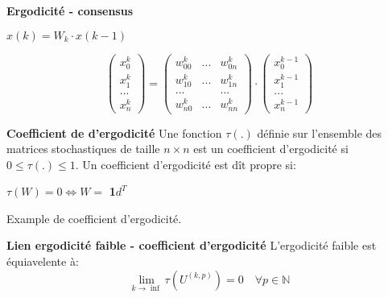 \documentclass{beamer}
\begin{document}
\begin{frame}
	\textbf{Ergodicité - consensus}

	\begin{center}		
		$ x(k) = W_k \cdot x(k-1)$
	\end{center}

	\begin{equation}
		\nonumber
		\begin{pmatrix}
			x^k_0\\
			x^k_1\\
			...\\
			x^k_n
		\end{pmatrix}
		=
		\begin{pmatrix}
			w^k_{00} & ... & w^k_{0n}\\
			w^k_{10} & ... & w^k_{1n}\\
			... &  & ... \\
			w^k_{n0} & ... & w^k_{nn}
		\end{pmatrix}
		\cdot
		\begin{pmatrix}
			x^{k-1}_0\\
			x^{k-1}_1\\
			...\\
			x^{k-1}_n
		\end{pmatrix}
	\end{equation}
\end{frame}

\begin{frame}
	\textbf{Coefficient de d'ergodicité}
		Une fonction $\tau(.)$ définie sur l'ensemble des matrices stochastiques de taille $n \times n$ est un coefficient d'ergodicité si $0 \leq \tau(.) \leq 1$.
		\bigbreak
		\pause
		Un coefficient d'ergodicité est dît propre si:
		\begin{center}
			$\tau(W) = 0 \iff W = $ \textbf{1}$d^T$
		\end{center}
		\pause
		Example de coefficient d'ergodicité.
\end{frame}

\begin{frame}
	\textbf{Lien ergodicité faible - coefficient d'ergodicité}
	L'ergodicité faible est équiavelente à:
	\begin{equation}
		\nonumber
		\lim_{k \to \inf} \tau(U^{(k, p)}) = 0 \quad \forall p \in \mathbb{N} 
	\end{equation}
\end{frame}
\end{document}
